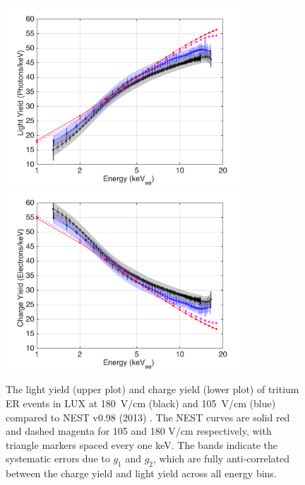 \begin{figure}[h!]
\includegraphics[width=90mm]{fig/ER_LY.png}
\includegraphics[width=90mm]{fig/ER_QY.png}
\caption{The light yield (upper plot) and charge yield (lower plot) of tritium ER events in LUX at 180~V/cm (black) and 105~V/cm (blue) compared to NEST v0.98 (2013) \cite{NEST_2013}. The NEST curves are solid red and dashed magenta for 105 and 180 V/cm respectively, with triangle markers spaced every one keV. The bands indicate the systematic errors due to $g_1$ and $g_2$, which are fully anti-correlated between the charge yield and light yield across all energy bins. }
\label{fig:ER-LY-QY}
\end{figure}

